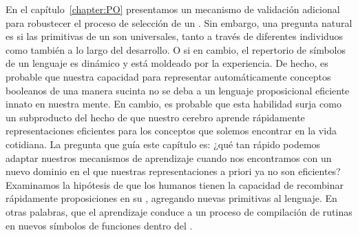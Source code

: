 
En el capítulo~\ref{chapter:PO} presentamos un mecanismo de validación adicional para robustecer el proceso de selección de un \lot. Sin embargo, una pregunta natural es si las primitivas de un \lot son universales, tanto a través de diferentes individuos como también a lo largo del desarrollo. O si en cambio, el repertorio de símbolos de un lenguaje es dinámico y está moldeado por la experiencia. De hecho, es probable que nuestra capacidad para representar automáticamente conceptos booleanos de una manera sucinta no se deba a un lenguaje proposicional eficiente innato en nuestra mente. En cambio, es probable que esta habilidad surja como un subproducto del hecho de que nuestro cerebro aprende rápidamente representaciones eficientes para los conceptos que solemos encontrar en la vida cotidiana. La pregunta que guía este capítulo es: ¿qué tan rápido podemos adaptar nuestros mecanismos de aprendizaje cuando nos encontramos con un nuevo dominio en el que nuestras representaciones a priori ya no son eficientes? Examinamos la hipótesis de que los humanos tienen la capacidad de recombinar rápidamente proposiciones en su \lot, agregando nuevas primitivas al lenguaje. En otras palabras, que el aprendizaje conduce a un proceso de compilación de rutinas en nuevos símbolos de funciones dentro del \lot.


